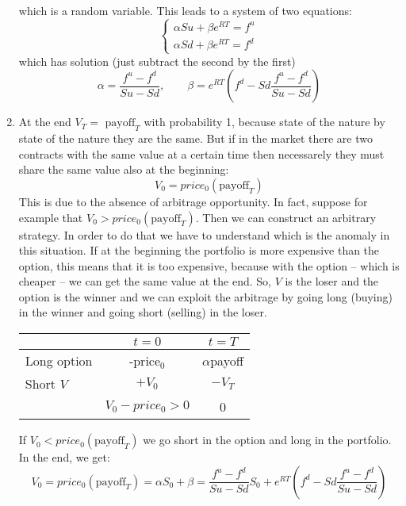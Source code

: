 \begin{enumerate}
    which is a random variable. This leads to a system of two equations:
    \begin{equation}
        \begin{cases}
            \alpha Su + \beta e^{RT} = f^u \\
            \alpha Sd + \beta e^{RT} = f^d
        \end{cases}
    \end{equation}
    which has solution (just subtract the second by the first)
    \begin{equation}
        \alpha = \dfrac{f^u-f^d}{Su-Sd}, \qquad \beta =  e^{RT}\left(f^d-Sd\dfrac{f^u-f^d}{Su-Sd}\right)
    \end{equation}
    \item At the end $V_T = \mbox{ payoff}_T$ with probability 1, because state of the nature by state of the nature they are the same. But if in the market there are two contracts with the same value at a certain time then necessarely they must share the same value also at the beginning: 
    \begin{equation*}
        V_0 = price_0(\mbox{payoff}_T)
    \end{equation*}
    This is due to the absence of arbitrage opportunity. In fact, suppose for example that $V_0>price_0(\mbox{payoff}_T)$. Then we can construct an arbitrary strategy. In order to do that we have to understand which is the anomaly in this situation. If at the beginning the portfolio is more expensive than the option, this means that it is too expensive, because with the option -- which is cheaper -- we can get the same value at the end. So, $V$ is the loser and the option is the winner and we can exploit the arbitrage by going long (buying) in the winner and going short (selling) in the loser.
    \begin{center}
        \begin{tabular}{lcc} 
            \toprule
                        & $t=0$        & $t=T$          \\\midrule
            Long option & -price$_0$   & $\alpha$payoff \\
            Short $V$   & $+V_0$       & $-V_T$         \\
            \midrule\midrule
             & $V_0-price_0>0$ & 0              \\\bottomrule
        \end{tabular}
    \end{center}
    If $V_0<price_0(\mbox{payoff}_T)$ we go short in the option and long in the portfolio. In the end, we get:
    \begin{equation}\label{V0}
        V_0 = price_0(\mbox{payoff}_T) = \alpha S_0 + \beta = \dfrac{f^u-f^d}{Su-Sd}S_0 + e^{RT}\left(f^d-Sd\dfrac{f^u-f^d}{Su-Sd}\right)
    \end{equation}\label{eq:bin_model}
\end{enumerate}
